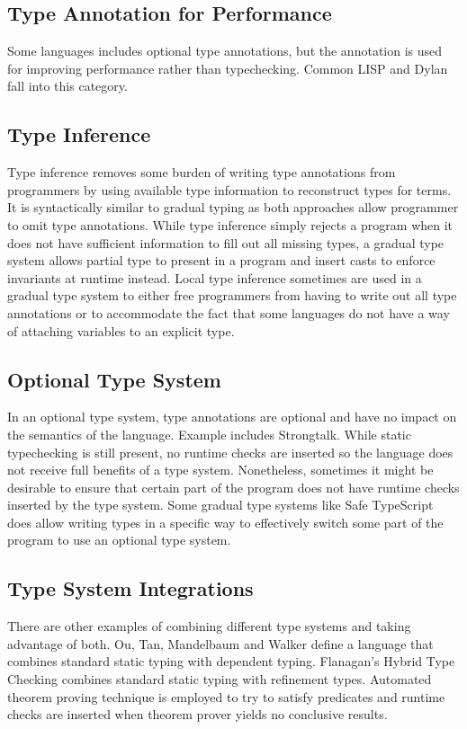 \subsection{Type Annotation for Performance}
Some languages includes optional type annotations, but
the annotation is used for improving performance rather than
typechecking.
Common LISP\cite{steele1982overview}
and Dylan\cite{feinberg1996dylan,shalit1996dylan} fall into this category.

\subsection{Type Inference}
Type inference \cite{damas1982principal,hindley1969principle,milner1978theory}
removes some burden of writing type annotations from programmers
by using available type information to reconstruct types for terms.
It is syntactically similar to gradual typing as both approaches
allow programmer to omit type annotations.
While type inference simply rejects a program when it
does not have sufficient information to fill out all missing types,
a gradual type system allows partial type to present in a program and insert casts
to enforce invariants at runtime instead.
Local type inference \cite{pierce2000local} sometimes are used in a gradual type
system to either free programmers from having to write out all type annotations
or to accommodate the fact that some languages do not have a way of attaching
variables to an explicit type.

\subsection{Optional Type System}

In an optional type system\cite{bracha2004pluggable},
type annotations are optional and have no impact on the semantics of the language.
Example includes Strongtalk\cite{bracha1993strongtalk}.
While static typechecking is still present, no runtime checks are inserted
so the language does not receive full benefits of a type system.
Nonetheless, sometimes it might be desirable to ensure that certain part of the program
does not have runtime checks inserted by the type system.
Some gradual type systems like Safe TypeScript\cite{rastogi2015safe} does allow writing
types in a specific way to effectively switch some part of the program to use an optional type system.

\subsection{Type System Integrations}

There are other examples of combining different type systems and taking advantage of both.
Ou, Tan, Mandelbaum and Walker\cite{ou2004dynamic} define a language that combines
standard static typing with dependent typing.
Flanagan's Hybrid Type Checking\cite{flanagan2006hybrid} combines standard static typing
with refinement types. Automated theorem proving technique is employed to try to satisfy predicates
and runtime checks are inserted when theorem prover yields no conclusive results.


